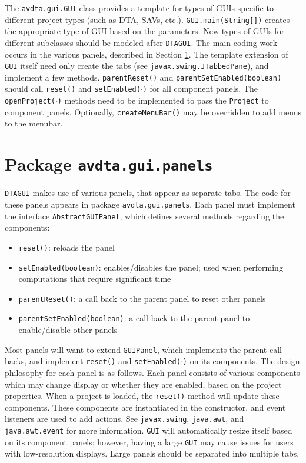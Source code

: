 %
The \texttt{avdta.gui.GUI} class provides a template for types of GUIs specific to different project types (such as DTA, SAVs, etc.). \texttt{GUI.main(String[])} creates the appropriate type of GUI based on the parameters. New types of GUIs for different subclasses should be modeled after \texttt{DTAGUI}. The main coding work occurs in the various panels, described in Section \ref{gui:panels}. The template extension of \texttt{GUI} itself need only create the tabs (see \texttt{javax.swing.JTabbedPane}), and implement a few methods. \texttt{parentReset()} and \texttt{parentSetEnabled(boolean)} should call \texttt{reset()} and \texttt{setEnabled($\cdot$)} for all component panels. The \texttt{openProject($\cdot$)} methods need to be implemented to pass the \texttt{Project} to component panels. Optionally, \texttt{createMenuBar()} may be overridden to add menus to the menubar.

\section{Package \texttt{avdta.gui.panels}}
\label{gui:panels}

\texttt{DTAGUI} makes use of various panels, that appear as separate tabs. The code for these panels appears in package \texttt{avdta.gui.panels}. Each panel must implement the interface \texttt{AbstractGUIPanel}, which defines several methods regarding the components:
\begin{itemize}
	\item \texttt{reset()}: reloads the panel
	\item \texttt{setEnabled(boolean)}: enables/disables the panel; used when performing computations that require significant time
	\item \texttt{parentReset()}: a call back to the parent panel to reset other panels
	\item \texttt{parentSetEnabled(boolean)}: a call back to the parent panel to enable/disable other panels
\end{itemize} 
Most panels will want to extend \texttt{GUIPanel}, which implements the parent call backs, and implement \texttt{reset()} and \texttt{setEnabled($\cdot$)} on its components. The design philosophy for each panel is as follows. Each panel consists of various components which may change display or whether they are enabled, based on the project properties. When a project is loaded, the \texttt{reset()} method will update these components. These components are instantiated in the constructor, and event listeners are used to add actions. See \texttt{javax.swing}, \texttt{java.awt}, and \texttt{java.awt.event} for more information. \texttt{GUI} will automatically resize itself based on its component panels; however, having a large \texttt{GUI} may cause issues for users with low-resolution displays. Large panels should be separated into multiple tabs.

